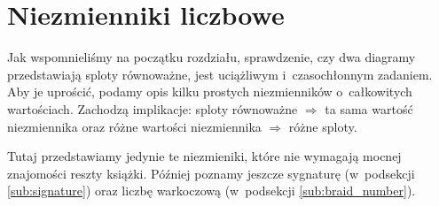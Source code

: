 \section{Niezmienniki liczbowe}
Jak wspomnieliśmy na początku rozdziału, sprawdzenie,
czy dwa diagramy przedstawiają sploty równoważne,
jest uciążliwym i~czasochłonnym zadaniem.
Aby je uprościć, podamy opis kilku prostych niezmienników o~całkowitych wartościach.
Zachodzą implikacje:
sploty równoważne $\Rightarrow$ ta sama wartość niezmiennika
oraz różne wartości niezmiennika $\Rightarrow$ różne sploty.

Tutaj przedstawiamy jedynie te niezmieniki, które nie wymagają mocnej znajomości reszty książki.
Później poznamy jeszcze sygnaturę (w~podsekcji \ref{sub:signature}) oraz liczbę warkoczową (w~podsekcji \ref{sub:braid_number}).















